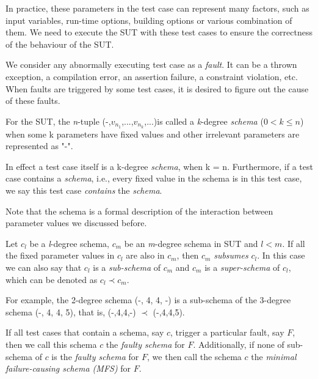 \documentclass[10pt,journal,compsoc]{IEEEtran}
\begin{document}
In practice, these parameters in the test case can represent many factors, such as input variables, run-time options, building options or various combination of them. We need to execute the SUT with these test cases to ensure the correctness of the behaviour of the SUT.

We consider any abnormally executing test case as a \emph{fault}. It can be a thrown exception, a compilation error, an assertion failure, a constraint violation, etc. When faults are triggered by some test cases, it is desired to figure out the cause of these faults.


\begin{definition}
For the SUT, the \emph{n}-tuple (-,$v_{n_{1}}$,...,$v_{n_{k}}$,...)is called a \emph{k}-degree \emph{schema} ($0 < k \leq n $) when some k parameters have fixed values and other irrelevant parameters are represented as "-".

In effect a test case itself is a k-degree \emph{schema}, when k = n. Furthermore, if a test case contains a \emph{schema}, i.e., every fixed value in the schema is in this test case, we say this test case \emph{contains} the \emph{schema}.
\end{definition}
Note that the schema is a formal description of the interaction between parameter values we discussed before.

\begin{definition}
Let $c_{l}$ be a \emph{l}-degree schema, $c_{m}$ be an \emph{m}-degree schema in SUT and $l < m$. If all the fixed parameter values in $c_{l}$ are also in $c_{m}$, then $c_{m}$ \emph{subsumes} $c_{l}$. In this case we can also say that $c_{l}$ is a \emph{sub-schema} of $c_{m}$ and $c_{m}$ is a \emph{super-schema} of $c_{l}$, which can be denoted as $c_{l} \prec  c_{m}$.
\end{definition}

For example,  the 2-degree schema (-, 4, 4, -) is a sub-schema of the 3-degree schema (-, 4, 4, 5), that is, (-,4,4,-) $\prec$ (-,4,4,5).

\begin{definition}
If all test cases that contain a schema, say $c$, trigger a particular fault, say $F$, then we call this schema $c$ the \emph{faulty schema} for $F$. Additionally, if none of sub-schema of $c$ is the \emph{faulty schema} for $F$, we then call the schema $c$ the \emph{minimal failure-causing schema (MFS)} \cite{nie2011minimal} for $F$.

\end{definition}
\end{document}
